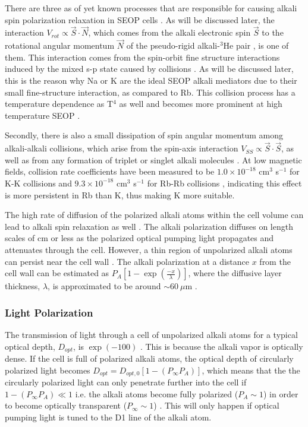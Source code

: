 There are three as of yet known processes that are responsible for causing alkali spin polarization relaxation in SEOP cells \cite{Gentile2017}. As will be discussed later, the interaction $V_{rot} \propto \Vec{S} \cdot \Vec{N} $, which comes from the alkali electronic spin $\Vec{S}$ to the rotational angular momentum $\Vec{N}$ of the pseudo-rigid alkali-$^3$He pair \cite{Walker1997}, is one of them. This interaction comes from the spin-orbit fine structure interactions induced by the mixed s-p state caused by collisions \cite{Walker1997}. As will be discussed later, this is the reason why Na or K are the ideal SEOP alkali mediators due to their small fine-structure interaction, as compared to Rb. This collision process has a temperature dependence as T$^4$ as well and becomes more prominent at high temperature SEOP \cite{Ben-AmarBaranga1998}.

Secondly, there is also a small dissipation of spin angular momentum among alkali-alkali collisions, which arise from the spin-axis interaction $ V_{SS} \propto \Vec{S} \cdot \Vec{S}$, \cite{Kadlecek2001} as well as from any formation of triplet or singlet alkali molecules \cite{Kadlecek2001, Kadlecek1998, Erickson2000}. At low magnetic fields, collision rate coefficients have been measured to be $1.0 \times 10^{-18}$ cm$^3$ s$^{-1}$ for K-K collisions and $9.3 \times 10^{-18}$ cm$^3$ s$^{-1}$ for Rb-Rb collisions \cite{Gentile2017}, indicating this effect is more persistent in Rb than K, thus making K more suitable.

The high rate of diffusion of the polarized alkali atoms within the cell volume can lead to alkali spin relaxation as well \cite{Gentile2017}. The alkali polarization diffuses on length scales of cm or less as the polarized optical pumping light propagates and attenuates through the cell. However, a thin region of unpolarized alkali atoms can persist near the cell wall \cite{Wagshul1994, Walker1997, Appelt1998, Nelson2001}. The alkali polarization at a distance $x$ from the cell wall can be estimated as $P_A [1- \exp{\left( \frac{-x}{\lambda} \right)}]$, where the diffusive layer thickness, $\lambda$, is approximated to be around $\sim 60 ~\mu $m \cite{Wagshul1994, Walker1997, Appelt1998, Nelson2001}.

\subsubsection{Light Polarization}

The transmission of light through a cell of unpolarized alkali atoms for a typical optical depth, $D_{opt}$, is $\exp{(-100)}$ \cite{Gentile2017}. This is because the alkali vapor is optically dense. If the cell is full of polarized alkali atoms, the optical depth of circularly polarized light becomes $D_{opt}=D_{opt,0}[1 - (P_{\infty}P_{A})]$, which means that the the circularly polarized light can only penetrate further into the cell if $ 1 - (P_{\infty}P_{A}) \ll 1$ i.e. the alkali atoms become fully polarized ($P_{A}\sim1$) in order to become optically transparent ($P_{\infty}\sim1$) \cite{Gentile2017}. This will only happen if optical pumping light is tuned to the D1 line of the alkali atom.


